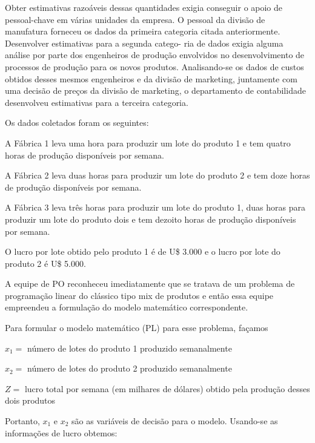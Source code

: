 Obter estimativas razoáveis dessas quantidades exigia conseguir o apoio de pessoal-chave em várias unidades da empresa. O pessoal da divisão de manufatura forneceu os dados da primeira categoria citada anteriormente. Desenvolver estimativas para a segunda catego-
ria de dados exigia alguma análise por parte dos engenheiros de produção envolvidos no desenvolvimento de processos de produção para os novos produtos. Analisando-se os dados de custos obtidos desses mesmos engenheiros e da divisão de marketing, juntamente com
uma decisão de preços da divisão de marketing, o departamento de contabilidade desenvolveu estimativas para a terceira categoria.

Os dados coletados foram os seguintes:

\begin{alineascomponto}
\item A Fábrica 1 leva uma hora para produzir um lote do produto 1 e tem quatro horas de produção disponíveis por semana.
\item A Fábrica 2 leva duas horas para produzir um lote do produto 2 e tem doze horas de produção disponíveis por semana.
\item A Fábrica 3 leva três horas para produzir um lote do produto 1, duas horas para produzir um lote do produto dois e tem dezoito horas de produção disponíveis por semana.
\item O lucro por lote obtido pelo produto 1 é de U\$ 3.000 e o lucro por lote do produto 2 é U\$ 5.000.
\end{alineascomponto}

A equipe de PO reconheceu imediatamente que se tratava de um problema de programação linear do clássico tipo mix de produtos e então essa equipe empreendeu a formulação do modelo matemático correspondente.

Para formular o modelo matemático (PL) para esse problema, façamos
\begin{alineas}
\item[] $x_1 =$ número de lotes do produto 1 produzido semanalmente
\item[] $x_2 =$ número de lotes do produto 2 produzido semanalmente
\item[] $Z =$ lucro total por semana (em milhares de dólares) obtido pela produção desses dois produtos
\end{alineas}

Portanto, $x_1$ e $x_2$ são as variáveis de decisão para o modelo. Usando-se as informações de lucro obtemos:

